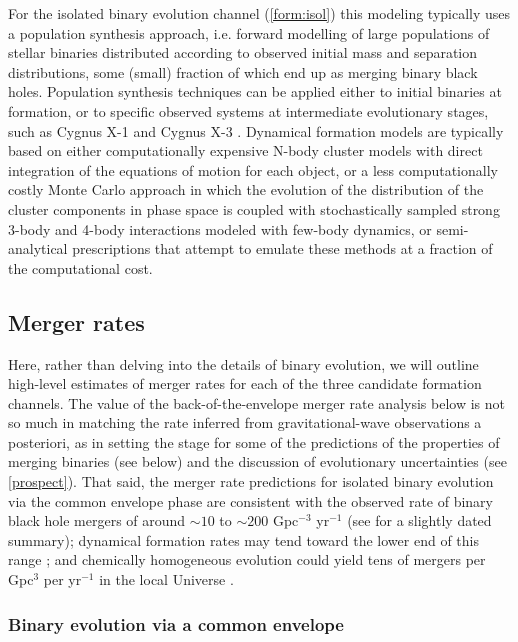 \documentclass[iop,onecolumn]{revtex4}
\begin{document}
For the isolated binary evolution channel (\autoref{form:isol}) this modeling typically uses a population synthesis approach, i.e. forward modelling of large populations of stellar binaries distributed according to observed initial mass and separation distributions, some (small) fraction of which end up as merging binary black holes. Population synthesis techniques can be applied either to initial binaries at formation, or to specific observed systems at intermediate evolutionary stages, such as Cygnus X-1 \citep{Bulik:2008} and Cygnus X-3 \citep{CygnusX3:2012}.  Dynamical formation models are typically based on either computationally expensive N-body cluster models with direct integration of the equations of motion for each object, or a less computationally costly Monte Carlo approach in which the evolution of the distribution of the cluster components in phase space is coupled with stochastically sampled strong 3-body and 4-body interactions modeled with few-body dynamics, or semi-analytical prescriptions that attempt to emulate these methods at a fraction of the computational cost. 

\subsection{Merger rates}

Here, rather than delving into the details of binary evolution, we will outline high-level estimates of merger rates for each of the three candidate formation channels. The value of the back-of-the-envelope merger rate analysis below is not so much in matching the rate inferred from gravitational-wave observations a posteriori, as in setting the stage for some of the predictions of the properties of merging binaries (see below) and the discussion of evolutionary uncertainties (see \autoref{prospect}).  That said, the merger rate predictions for isolated binary evolution via the common envelope phase are consistent with the observed rate of binary black hole mergers of around $\sim 10$ to $\sim 200$ Gpc$^{-3}$ yr$^{-1}$ \citep{GW150914:rates,GW170104} (see \citet{ratesdoc} for a slightly dated summary); dynamical formation rates may tend toward the lower end of this range \citep{Rodriguez:2016}; and chemically homogeneous evolution could yield tens of mergers per Gpc$^{3}$ per yr$^{-1}$ in the local Universe \citep{MandeldeMink:2016,Marchant:2016}.

\subsubsection{Binary evolution via a common envelope}\label{sec:CErates}
\end{document}
